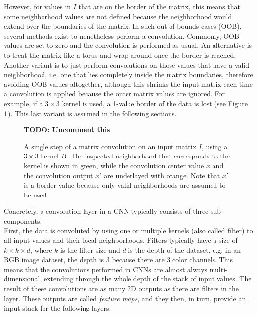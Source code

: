 However, for values in $I$ that are on the border of the matrix, this means that some neighborhood values are not defined because the neighborhood would extend over the boundaries of the matrix. In such out-of-bounds cases (OOB), several methods exist to nonetheless perform a convolution. Commonly, OOB values are set to zero and the convolution is performed as usual. An alternative is to treat the matrix like a torus and wrap around once the border is reached. Another variant is to just perform convolutions on those values that have a valid neighborhood, i.e. one that lies completely inside the matrix boundaries, therefore avoiding OOB values altogether, although this shrinks the input matrix each time a convolution is applied because the outer matrix values are ignored. For example, if a $3 \times 3$ kernel is used, a 1-value border of the data is lost (see Figure \textbf{\ref{fig:convolution}}). This last variant is assumed in the following sections.\\

\begin {figure}[!ht]
	\begin{center}
		\textbf{TODO: Uncomment this}
	\end{center}
	\caption{A single step of a matrix convolution on an input matrix $I$, using a $3 \times 3$ kernel $B$. The inspected neighborhood that corresponds to the kernel is shown in green, while the convolution center value $x$ and the convolution output $x'$ are underlayed with orange. Note that $x'$ is a border value because only valid neighborhoods are assumed to be used.}
	\label{fig:convolution}
\end {figure}

\noindent Concretely, a convolution layer in a CNN typically consists of three sub-components:\\

\noindent First, the data is convoluted by using one or multiple kernels (also called filter) to all input values and their local neighborhoods. Filters typically have a size of $k \times k \times d$, where $k$ is the filter size and $d$ is the depth of the dataset, e.g. in an RGB image dataset, the depth is 3 because there are 3 color channels. This means that the convolutions performed in CNNs are almost always multi-dimensional, extending through the whole depth of the stack of input values. The result of these convolutions are as many 2D outputs as there are filters in the layer. These outputs are called \textit{feature maps}, and they then, in turn, provide an input stack for the following layers.


